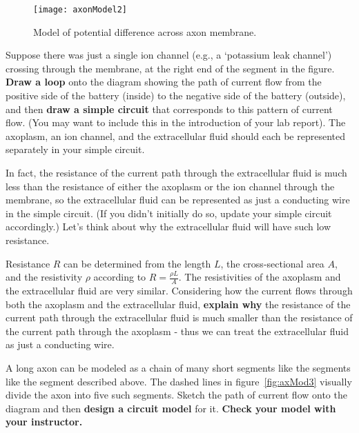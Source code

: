 \begin{wrapfigure}{R}{0.45\textwidth}
  \vspace{-10pt}  
  \begin{center}
    \texttt{[image: axonModel2]}
  \end{center}
  \caption{Model of potential difference across axon membrane.}
  \label{fig:axMod2}
  \vspace{-5pt}
\end{wrapfigure}

\par 
Suppose there was just a single ion channel (e.g., a `potassium leak channel') crossing through the membrane, at the right end of the segment in the figure. 
\textbf{Draw a loop} onto the diagram showing the path of current flow from the positive side of the battery (inside) to the negative side of the battery (outside), and then \textbf{draw a simple circuit} that corresponds to this pattern of current flow.
(You may want to include this in the introduction of your lab report).
The axoplasm, an ion channel, and the extracellular fluid should each be represented separately in your simple circuit.
\par 
In fact, the resistance of the current path through the extracellular fluid is much less than the resistance of either the axoplasm or the ion channel through the membrane, so the extracellular fluid can be represented as just a conducting wire in the simple circuit.
(If you didn't initially do so, update your simple circuit accordingly.) 
Let's think about why the extracellular fluid will have such low resistance.
\par 
Resistance $R$ can be determined from the length $L$, the cross-sectional area $A$, and the resistivity $\rho$ according to $R = \frac{\rho L}{A}$.
The resistivities of the axoplasm and the extracellular fluid are very similar.
Considering how the current flows through both the axoplasm and the extracellular fluid, \textbf{explain why} the resistance of the current path through the extracellular fluid is much smaller than the resistance of the current path through the axoplasm - thus we can treat the extracellular fluid as just a conducting wire.
\par 
A long axon can be modeled as a chain of many short segments like the segments like the segment described above.
The dashed lines in figure~\ref{fig:axMod3} visually divide the axon into five such segments.
Sketch the path of current flow onto the diagram and then \textbf{design a circuit model} for it.
\textbf{Check your model with your instructor.}
\par 

